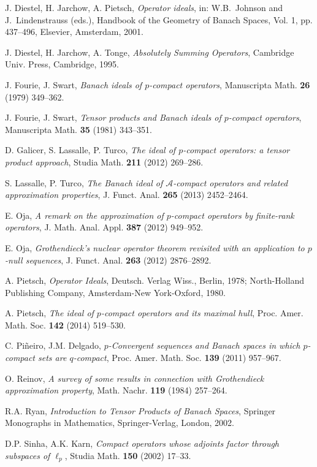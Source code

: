 \documentclass[a4paper,11pt]{amsart}
\theoremstyle{definition}
\theoremstyle{definition}
\theoremstyle{definition}
\begin{document}
\begin{thebibliography}{DFJP}
 J. Diestel, H. Jarchow, A. Pietsch, {\em Operator ideals},  in: W.B.~Johnson and J.~Lindenstrauss (eds.), Handbook of the Geometry of Banach Spaces, Vol. 1, pp. 437--496, Elsevier, Amsterdam, 2001. 

 J. Diestel, H. Jarchow, A. Tonge, {\em Absolutely Summing Operators}, Cambridge Univ. Press, Cambridge, 1995.

 J. Fourie, J. Swart, {\em Banach ideals of $p$-compact operators}, Manuscripta Math. {\bf 26} (1979) 349--362.

 J. Fourie, J. Swart, {\em Tensor products and {B}anach ideals of {$p$}-compact operators}, Manuscripta Math. {\bf 35} (1981) 343--351.

 D. Galicer, S. Lassalle, P. Turco, {\em The ideal of $p$-compact operators: a tensor product approach}, Studia Math. {\bf 211} (2012) 269--286.

 S. Lassalle, P. Turco, {\em The Banach ideal of ${{\mathcal A}}$-compact operators and related approximation properties}, J. Funct. Anal. {\bf 265} (2013) 2452--2464.

 E. Oja, {\em A remark on the approximation of $p$-compact operators by finite-rank operators}, J. Math. Anal. Appl. {\bf 387} (2012) 949--952.

 E. Oja, {\em Grothendieck's nuclear operator theorem revisited with an application to $p$-null sequences}, J. Funct. Anal. {\bf 263} (2012) 2876--2892.

 A. Pietsch, {\em Operator Ideals}, Deutsch. Verlag Wiss., Berlin, 1978; North-Holland Publishing Company, Amsterdam-New York-Oxford, 1980.

 A. Pietsch, {\em The ideal of $p$-compact operators and its maximal hull}, Proc. Amer. Math. Soc. {\bf 142} (2014) 519--530.

 C. Pi\~{n}eiro, J.M. Delgado, {\em $p$-Convergent sequences and Banach spaces in which $p$-compact sets are $q$-compact}, Proc. Amer. Math. Soc. {\bf 139} (2011) 957--967.

 O. Reinov, {\em A survey of some results in connection with Grothendieck approximation property}, Math. Nachr. {\bf 119} (1984) 257--264.

 R.A. Ryan, {\em Introduction to Tensor Products of Banach Spaces}, Springer Monographs in Mathematics, Springer-Verlag, London, 2002.

 D.P. Sinha, A.K. Karn, {\em Compact operators whose adjoints factor through subspaces of $\ell_p$}, Studia Math. {\bf 150} (2002) 17--33.


\end{thebibliography}
\end{document}
